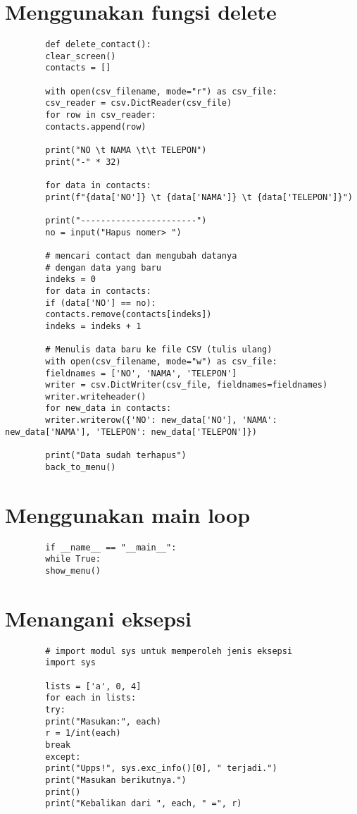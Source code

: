 \documentclass{article}
\begin{document}
	\section{Menggunakan fungsi delete}
	\begin{lstlisting}
		def delete_contact():
		clear_screen()
		contacts = []
		
		with open(csv_filename, mode="r") as csv_file:
		csv_reader = csv.DictReader(csv_file)
		for row in csv_reader:
		contacts.append(row)
		
		print("NO \t NAMA \t\t TELEPON")
		print("-" * 32)
		
		for data in contacts:
		print(f"{data['NO']} \t {data['NAMA']} \t {data['TELEPON']}")
		
		print("-----------------------")
		no = input("Hapus nomer> ")
		
		# mencari contact dan mengubah datanya
		# dengan data yang baru
		indeks = 0
		for data in contacts:
		if (data['NO'] == no):
		contacts.remove(contacts[indeks])
		indeks = indeks + 1
		
		# Menulis data baru ke file CSV (tulis ulang)
		with open(csv_filename, mode="w") as csv_file:
		fieldnames = ['NO', 'NAMA', 'TELEPON']
		writer = csv.DictWriter(csv_file, fieldnames=fieldnames)
		writer.writeheader()
		for new_data in contacts:
		writer.writerow({'NO': new_data['NO'], 'NAMA': new_data['NAMA'], 'TELEPON': new_data['TELEPON']}) 
		
		print("Data sudah terhapus")
		back_to_menu()
	\end{lstlisting}
	
	\section{Menggunakan main loop}
	\begin{lstlisting}
		if __name__ == "__main__":
		while True:
		show_menu()
	\end{lstlisting}
	
	\section{Menangani eksepsi}
	\begin{lstlisting}
		# import modul sys untuk memperoleh jenis eksepsi
		import sys
		
		lists = ['a', 0, 4]
		for each in lists:
		try:
		print("Masukan:", each)
		r = 1/int(each)
		break
		except:
		print("Upps!", sys.exc_info()[0], " terjadi.")
		print("Masukan berikutnya.")
		print()
		print("Kebalikan dari ", each, " =", r)
	\end{lstlisting}
	
\end{document}
